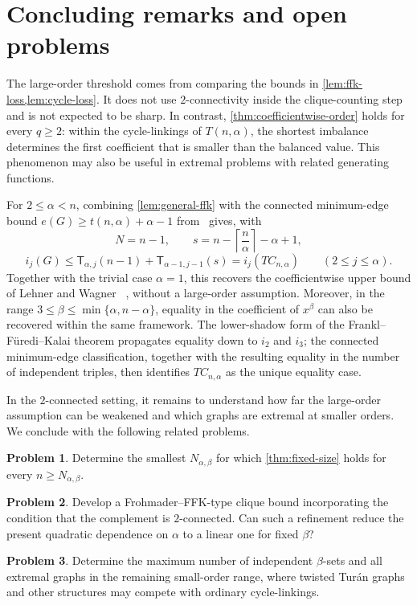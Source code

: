 \documentclass[11pt]{article}
\theoremstyle{definition}
\newtheorem{problem}[problem]{Problem}
\newcommand{\turcl}[3]{\mathsf{T}_{#1,#2}(#3)}
\begin{document}
\section{Concluding remarks and open problems}

The large-order threshold comes from comparing the bounds in
\cref{lem:ffk-loss,lem:cycle-loss}. It does not use $2$-connectivity
inside the clique-counting step and is not expected to be sharp.
In contrast, \cref{thm:coefficientwise-order} holds for every $q\ge2$:
within the cycle-linkings of $T(n,\alpha)$, the shortest imbalance
determines the first coefficient that is smaller than the balanced
value. This phenomenon may also be useful in extremal problems with
related generating functions.

For $2\le\alpha<n$, combining \cref{lem:general-ffk} with the
connected minimum-edge bound
$e(G)\ge t(n,\alpha)+\alpha-1$
from~\cite[Proposition~5]{BougardJoret2008} gives, with
\[
 N=n-1,\qquad
 s=n-\left\lceil\frac n\alpha\right\rceil-\alpha+1,
\]
\[
 i_j(G)\le
 \turcl{\alpha}{j}{n-1}
 +\turcl{\alpha-1}{j-1}{s}
 =i_j(TC_{n,\alpha})
 \qquad(2\le j\le\alpha).
\]
Together with the trivial case $\alpha=1$, this recovers the
coefficientwise upper bound of Lehner and Wagner
~\cite[Theorem~2]{LehnerWagner2017}, without a large-order assumption.
Moreover, in the range
$3\le\beta\le\min\{\alpha,n-\alpha\}$, equality in the coefficient
of $x^\beta$ can also be recovered within the same framework.
The lower-shadow form of the Frankl--F\"uredi--Kalai theorem
propagates equality down to $i_2$ and $i_3$; the connected
minimum-edge classification, together with the resulting equality
in the number of independent triples, then identifies
$TC_{n,\alpha}$ as the unique equality case.

In the $2$-connected setting, it remains to understand how far
the large-order assumption can be weakened and which graphs are
extremal at smaller orders. We conclude with the following
related problems.
\begin{problem}
Determine the smallest $N_{\alpha,\beta}$ for which
\cref{thm:fixed-size} holds for every $n\ge N_{\alpha,\beta}$.
\end{problem}

\begin{problem}
Develop a Frohmader--FFK-type clique bound incorporating the condition
that the complement is $2$-connected. Can such a refinement reduce the
present quadratic dependence on $\alpha$ to a linear one for fixed
$\beta$?
\end{problem}

\begin{problem}
Determine the maximum number of independent $\beta$-sets and all
extremal graphs in the remaining small-order range, where twisted
Tur\'an graphs and other structures may compete with ordinary
cycle-linkings.
\end{problem}



\end{document}
